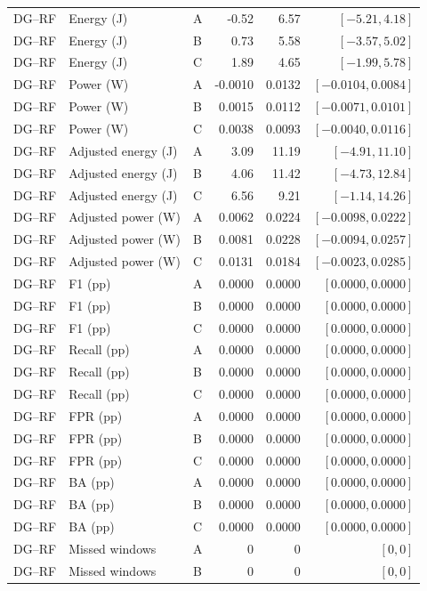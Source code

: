 \begin{longtable}{lllrrr}
DG--RF & Energy (J) & A & -0.52 & 6.57 & $[-5.21,4.18]$\\
DG--RF & Energy (J) & B & 0.73 & 5.58 & $[-3.57,5.02]$\\
DG--RF & Energy (J) & C & 1.89 & 4.65 & $[-1.99,5.78]$\\
DG--RF & Power (W) & A & -0.0010 & 0.0132 & $[-0.0104,0.0084]$\\
DG--RF & Power (W) & B & 0.0015 & 0.0112 & $[-0.0071,0.0101]$\\
DG--RF & Power (W) & C & 0.0038 & 0.0093 & $[-0.0040,0.0116]$\\
DG--RF & Adjusted energy (J) & A & 3.09 & 11.19 & $[-4.91,11.10]$\\
DG--RF & Adjusted energy (J) & B & 4.06 & 11.42 & $[-4.73,12.84]$\\
DG--RF & Adjusted energy (J) & C & 6.56 & 9.21 & $[-1.14,14.26]$\\
DG--RF & Adjusted power (W) & A & 0.0062 & 0.0224 & $[-0.0098,0.0222]$\\
DG--RF & Adjusted power (W) & B & 0.0081 & 0.0228 & $[-0.0094,0.0257]$\\
DG--RF & Adjusted power (W) & C & 0.0131 & 0.0184 & $[-0.0023,0.0285]$\\
DG--RF & F1 (pp) & A & 0.0000 & 0.0000 & $[0.0000,0.0000]$\\
DG--RF & F1 (pp) & B & 0.0000 & 0.0000 & $[0.0000,0.0000]$\\
DG--RF & F1 (pp) & C & 0.0000 & 0.0000 & $[0.0000,0.0000]$\\
DG--RF & Recall (pp) & A & 0.0000 & 0.0000 & $[0.0000,0.0000]$\\
DG--RF & Recall (pp) & B & 0.0000 & 0.0000 & $[0.0000,0.0000]$\\
DG--RF & Recall (pp) & C & 0.0000 & 0.0000 & $[0.0000,0.0000]$\\
DG--RF & FPR (pp) & A & 0.0000 & 0.0000 & $[0.0000,0.0000]$\\
DG--RF & FPR (pp) & B & 0.0000 & 0.0000 & $[0.0000,0.0000]$\\
DG--RF & FPR (pp) & C & 0.0000 & 0.0000 & $[0.0000,0.0000]$\\
DG--RF & BA (pp) & A & 0.0000 & 0.0000 & $[0.0000,0.0000]$\\
DG--RF & BA (pp) & B & 0.0000 & 0.0000 & $[0.0000,0.0000]$\\
DG--RF & BA (pp) & C & 0.0000 & 0.0000 & $[0.0000,0.0000]$\\
DG--RF & Missed windows & A & 0 & 0 & $[0,0]$\\
DG--RF & Missed windows & B & 0 & 0 & $[0,0]$\\

\end{longtable}
